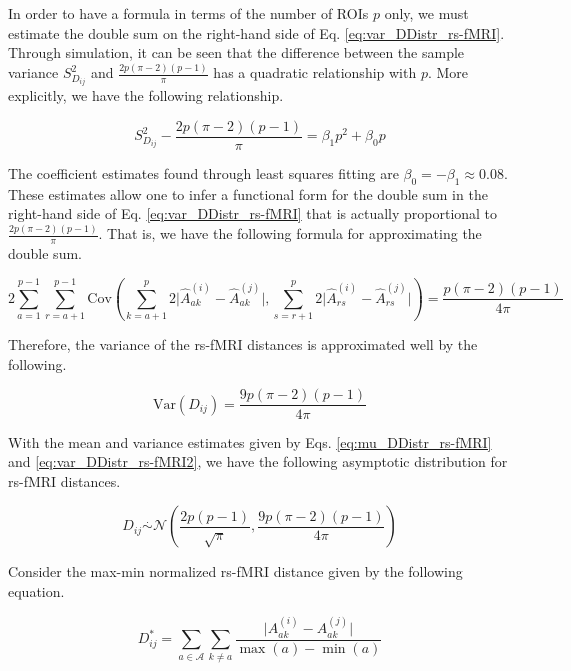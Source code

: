\documentclass[10pt,letterpaper]{article}\usepackage[]{graphicx}\usepackage[]{color}
\begin{document}
In order to have a formula in terms of the number of ROIs $p$ only, we must estimate the double sum on the right-hand side of Eq. \ref{eq:var_DDistr_rs-fMRI}. Through simulation, it can be seen that the difference between the sample variance $S^2_{D_{ij}}$ and $\frac{2p(\pi-2)(p-1)}{\pi}$ has a quadratic relationship with $p$. More explicitly, we have the following relationship.

\begin{equation}\label{eq:estimate_cov}
S^2_{D_{ij}} - \frac{2p(\pi-2)(p-1)}{\pi} = \beta_1 p^2 + \beta_0 p
\end{equation}

The coefficient estimates found through least squares fitting are $\beta_0 = - \beta_1 \approx 0.08$. These estimates allow one to infer a functional form for the double sum in the right-hand side of Eq. \ref{eq:var_DDistr_rs-fMRI} that is actually proportional to $\frac{2p(\pi-2)(p-1)}{\pi}$. That is, we have the following formula for approximating the double sum.

\begin{equation}\label{eq:estimate_cov_form}
2\sum_{a = 1}^{p-1} \sum_{r=a+1}^{p-1} \text{Cov}\left(\sum_{k=a+1}^{p} 2\bigl|\hat{A}^{(i)}_{ak} - \hat{A}^{(j)}_{ak}\bigr|, \sum_{s=r+1}^{p} 2\bigl|\hat{A}^{(i)}_{rs} - \hat{A}^{(j)}_{rs}\bigr|\right) = \frac{p(\pi - 2)(p - 1)}{4\pi}
\end{equation}

Therefore, the variance of the rs-fMRI distances is approximated well by the following.

\begin{equation}\label{eq:var_DDistr_rs-fMRI2}
\text{Var}(D_{ij}) = \frac{9p(\pi - 2)(p-1)}{4\pi}
\end{equation}

With the mean and variance estimates given by Eqs. \ref{eq:mu_DDistr_rs-fMRI} and \ref{eq:var_DDistr_rs-fMRI2}, we have the following asymptotic distribution for rs-fMRI distances.

\begin{equation}\label{eq:DDistr_rs-fMRI}
D_{ij} \overset{.}{\sim} \mathcal{N}\left(\frac{2p(p-1)}{\sqrt{\pi}}, \frac{9p(\pi - 2)(p-1)}{4\pi}\right)
\end{equation}

Consider the max-min normalized rs-fMRI distance given by the following equation.

\begin{equation}\label{eq:max-min_diff_rs-fMRI}
D^*_{ij} = \sum_{a \in \mathcal{A}} \sum_{k \neq a} \frac{\bigl|A^{(i)}_{ak} - A^{(j)}_{ak}\bigr|}{\max(a) - \min(a)}
\end{equation}
\end{document}
